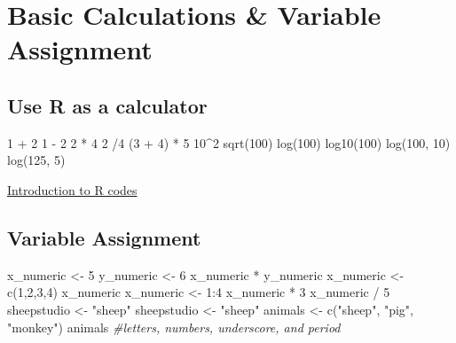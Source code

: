 \documentclass[
]{book}
\newenvironment{Shaded}{\begin{snugshade}}{\end{snugshade}}
\newcommand{\CommentTok}[1]{\textcolor[rgb]{0.56,0.35,0.01}{\textit{#1}}}
\newcommand{\DecValTok}[1]{\textcolor[rgb]{0.00,0.00,0.81}{#1}}
\newcommand{\FunctionTok}[1]{\textcolor[rgb]{0.00,0.00,0.00}{#1}}
\newcommand{\NormalTok}[1]{#1}
\newcommand{\OtherTok}[1]{\textcolor[rgb]{0.56,0.35,0.01}{#1}}
\newcommand{\SpecialCharTok}[1]{\textcolor[rgb]{0.00,0.00,0.00}{#1}}
\newcommand{\StringTok}[1]{\textcolor[rgb]{0.31,0.60,0.02}{#1}}
\begin{document}
\hypertarget{basic-calculations-variable-assignment}{%
\chapter{Basic Calculations \& Variable Assignment}\label{basic-calculations-variable-assignment}}

\hypertarget{use-r-as-a-calculator}{%
\section{Use R as a calculator}\label{use-r-as-a-calculator}}

\begin{Shaded}
\begin{Highlighting}[]
\DecValTok{1} \SpecialCharTok{+} \DecValTok{2}
\DecValTok{1} \SpecialCharTok{{-}} \DecValTok{2}
\DecValTok{2} \SpecialCharTok{*} \DecValTok{4}
\DecValTok{2} \SpecialCharTok{/}\DecValTok{4}
\NormalTok{(}\DecValTok{3} \SpecialCharTok{+} \DecValTok{4}\NormalTok{) }\SpecialCharTok{*} \DecValTok{5}
\DecValTok{10}\SpecialCharTok{\^{}}\DecValTok{2}
\FunctionTok{sqrt}\NormalTok{(}\DecValTok{100}\NormalTok{)}
\FunctionTok{log}\NormalTok{(}\DecValTok{100}\NormalTok{)}
\FunctionTok{log10}\NormalTok{(}\DecValTok{100}\NormalTok{)}
\FunctionTok{log}\NormalTok{(}\DecValTok{100}\NormalTok{, }\DecValTok{10}\NormalTok{)}
\FunctionTok{log}\NormalTok{(}\DecValTok{125}\NormalTok{, }\DecValTok{5}\NormalTok{)}
\end{Highlighting}
\end{Shaded}

\protect\hyperlink{introduction-to-r-codes-1}{Introduction to R codes}

\hypertarget{variable-assignment}{%
\section{Variable Assignment}\label{variable-assignment}}

\begin{Shaded}
\begin{Highlighting}[]
\NormalTok{x\_numeric }\OtherTok{\textless{}{-}}  \DecValTok{5}
\NormalTok{y\_numeric }\OtherTok{\textless{}{-}} \DecValTok{6}
\NormalTok{x\_numeric }\SpecialCharTok{*}\NormalTok{ y\_numeric}
\NormalTok{x\_numeric }\OtherTok{\textless{}{-}} \FunctionTok{c}\NormalTok{(}\DecValTok{1}\NormalTok{,}\DecValTok{2}\NormalTok{,}\DecValTok{3}\NormalTok{,}\DecValTok{4}\NormalTok{)}
\NormalTok{x\_numeric}
\NormalTok{x\_numeric }\OtherTok{\textless{}{-}} \DecValTok{1}\SpecialCharTok{:}\DecValTok{4}
\NormalTok{x\_numeric }\SpecialCharTok{*} \DecValTok{3}
\NormalTok{x\_numeric }\SpecialCharTok{/} \DecValTok{5}
\NormalTok{sheepstudio }\OtherTok{\textless{}{-}} \StringTok{"sheep"}
\NormalTok{sheepstudio }\OtherTok{\textless{}{-}} \StringTok{"sheep"}
\NormalTok{animals }\OtherTok{\textless{}{-}} \FunctionTok{c}\NormalTok{(}\StringTok{"sheep"}\NormalTok{, }\StringTok{"pig"}\NormalTok{, }\StringTok{"monkey"}\NormalTok{)}
\NormalTok{animals }\CommentTok{\#letters, numbers, underscore, and period}
\end{Highlighting}
\end{Shaded}
\end{document}

